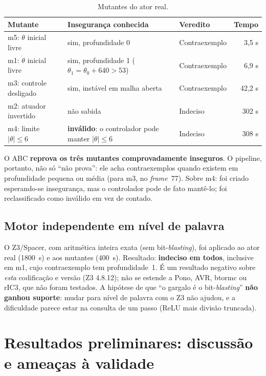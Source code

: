 \documentclass[12pt,openright,oneside,a4paper,chapter=TITLE,sumario=tradicional,english,brazil]{abntex2}
\begin{document}
\begin{table}[htb]
\caption{Mutantes do ator real.}\label{tab:mut}
\centering
\begin{tabular}{p{3.6cm}|p{4.2cm}|p{3.0cm}|r}
\toprule
\textbf{Mutante} & \textbf{Insegurança conhecida} & \textbf{Veredito} & \textbf{Tempo} \\
\midrule
m5: $\theta$ inicial livre & sim, profundidade 0 & Contraexemplo & 3,5 s \\
m1: $\dot\theta$ inicial livre & sim, profundidade 1 ($\theta_1=\theta_0+640>53$) & Contraexemplo & 6,9 s \\
m3: controle desligado & sim, instável em malha aberta & Contraexemplo & 42,2 s \\
m2: atuador invertido & não sabida & Indeciso & 302 s \\
m4: limite $|\theta|\le6$ & \textbf{inválido}: o controlador pode manter $|\theta|\le6$ & Indeciso & 308 s \\
\bottomrule
\end{tabular}
\end{table}

O ABC \textbf{reprova os três mutantes comprovadamente inseguros}. O pipeline, portanto, não só ``não prova'': ele acha contraexemplos quando existem em profundidade pequena ou média (para m3, no \emph{frame}~77). Sobre m4: foi criado esperando-se insegurança, mas o controlador pode de fato mantê-lo; foi reclassificado como inválido em vez de contado.

\subsection{Motor independente em nível de palavra}

O Z3/Spacer, com aritmética inteira exata (sem bit-\emph{blasting}), foi aplicado ao ator real (1800~s) e aos mutantes (400~s). Resultado: \textbf{indeciso em todos}, inclusive em m1, cujo contraexemplo tem profundidade~1. É um resultado negativo sobre \emph{esta} codificação e versão (Z3 4.8.12); não se estende a Pono, AVR, btormc ou rIC3, que não foram testados. A hipótese de que ``o gargalo é o bit-\emph{blasting}'' \textbf{não ganhou suporte}: mudar para nível de palavra com o Z3 não ajudou, e a dificuldade parece estar na consulta de um passo (ReLU mais divisão truncada).

\section{Resultados preliminares: discussão e ameaças à validade}\label{sec:discpre}
\end{document}

